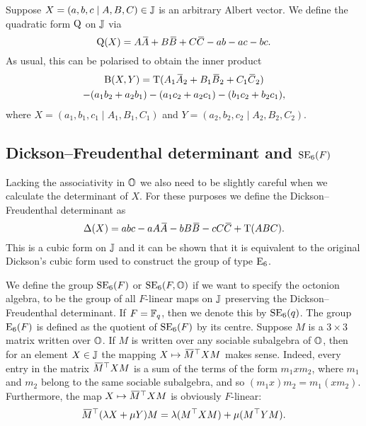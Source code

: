 Suppose $X = (a,b,c \mid A,B,C) \in \mathbb{J}$ is an arbitrary Albert vector. We define
the quadratic form $\mathord{\mathrm{Q}}$ on $\mathbb{J}$ via
\begin{equation}
	\label{eq:qform_on_J}
	\QQ(X) = A\ovA + B\ovB + C\ovC - ab - ac - bc.
\end{equation}
As usual, this can be polarised to obtain the inner product
\begin{multline}
	\label{eq:inner_product_in_J}
	\BB(X,Y) = \Tr( A_1 \ovA_2 + B_1 \ovB_2 + C_1 \ovC_2 ) \\
		- (a_1 b_2 + a_2 b_1) - (a_1 c_2 + a_2 c_1) - (b_1 c_2 + b_2 c_1),
\end{multline}
where $X = (a_1, b_1, c_1 \mid A_1, B_1, C_1)$ and $Y = (a_2, b_2, c_2 \mid A_2, B_2, C_2 )$.


\subsection{Dickson--Freudenthal determinant and $\mathrm{SE}_6(F)$}

Lacking the associativity in $\mathbb{O}$ we also need to be slightly careful when we calculate
the determinant of $X$. For these purposes we define the Dickson--Freudenthal determinant
as
\begin{equation}
	\fdet(X) = abc - aA\ovA - bB\ovB - cC\ovC + \Tr(ABC).
\end{equation}
This is a cubic form on $\mathbb{J}$ and it can be shown that it is equivalent to the 
original Dickson's cubic form \cite{Dickson1} used to construct the group of type $\mathrm{E}_6$. 

We define the group $\mathrm{SE}_6(F)$ or $\mathrm{SE}_6(F,\mathbb{O})$ if we want to specify the octonion 
algebra, to be the group of all $F$-linear maps on $\mathbb{J}$ preserving
 the Dickson--Freudenthal determinant. If $F = \mathbb{F}_q$, then we denote this by $\mathrm{SE}_6(q)$.
  The group $\mathord{\mathrm{E}}_6(F)$ is defined as the quotient
 of $\mathrm{SE}_6(F)$ by its centre.
Suppose $M$ is a $3\times 3$ matrix written over $\mathbb{O}$. If $M$ is written over any 
sociable subalgebra of $\mathbb{O}$, then for an element $X \in \mathbb{J}$ the mapping 
$X \mapsto \mathord{\mbox{\hspace*{0pt}}\,\overline{\!M\!\!\;}\!\:}\mbox{\hspace*{0pt}}^{\top} X M$ makes sense. Indeed, every entry in the matrix $\mathord{\mbox{\hspace*{0pt}}\,\overline{\!M\!\!\;}\!\:}\mbox{\hspace*{0pt}}^{\top} X M$
is a sum of the terms of the form $m_1 x m_2$, where $m_1$ and $m_2$ belong to the same
sociable subalgebra, and so $(m_1 x) m_2 = m_1 (x m_2)$. Furthermore, the map
$X \mapsto \mathord{\mbox{\hspace*{0pt}}\,\overline{\!M\!\!\;}\!\:}\mbox{\hspace*{0pt}}^{\top} X M$ is obviously $F$-linear:
\begin{equation*}
	\mathord{\mbox{\hspace*{0pt}}\,\overline{\!M\!\!\;}\!\:}\mbox{\hspace*{0pt}}^{\top} (\lambda X + \mu Y) M = \lambda (  M^{\top} X M ) + \mu ( M^{\top} Y M ).
\end{equation*}

